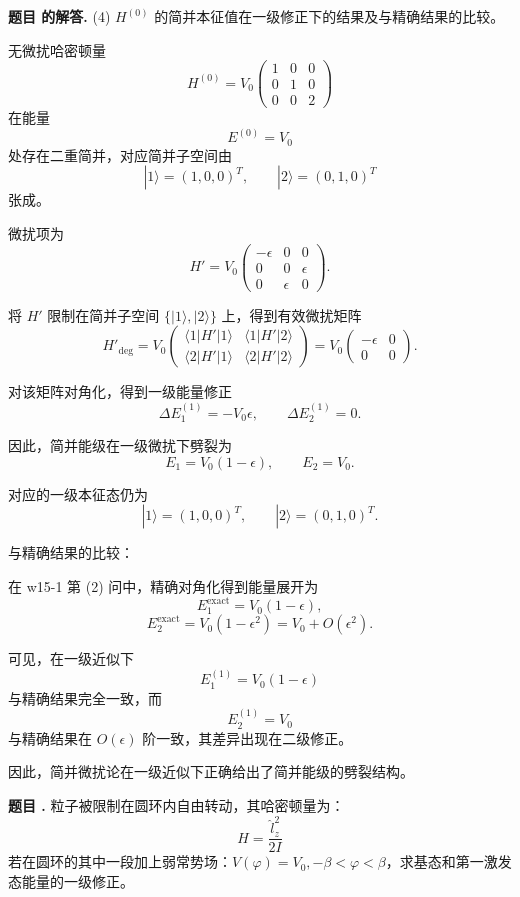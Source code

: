 \documentclass[12pt, a4paper, oneside]{ctexart}
\newcounter{problemname}
\newenvironment{problem}
  {\begin{shaded}\stepcounter{problemname}\par\noindent\textbf{题目 \theproblemname. }}
  {\end{shaded}\par}
\newenvironment{solution}
  {\par\noindent\textbf{题目 \theproblemname 的解答. }}
  {\par}
\begin{document}
\begin{solution}
  (4) $H^{(0)}$ 的简并本征值在一级修正下的结果及与精确结果的比较。

无微扰哈密顿量
\[
H^{(0)} = V_0
\begin{pmatrix}
1 & 0 & 0 \\
0 & 1 & 0 \\
0 & 0 & 2
\end{pmatrix}
\]
在能量
\[
E^{(0)} = V_0
\]
处存在二重简并，对应简并子空间由
\[
|1\rangle = (1,0,0)^T, \qquad
|2\rangle = (0,1,0)^T
\]
张成。

微扰项为
\[
H' = V_0
\begin{pmatrix}
-\epsilon & 0 & 0 \\
0 & 0 & \epsilon \\
0 & \epsilon & 0
\end{pmatrix}.
\]

将 $H'$ 限制在简并子空间 $\{|1\rangle,|2\rangle\}$ 上，得到有效微扰矩阵
\[
H'_{\text{deg}}
=
V_0
\begin{pmatrix}
\langle 1|H'|1\rangle & \langle 1|H'|2\rangle \\
\langle 2|H'|1\rangle & \langle 2|H'|2\rangle
\end{pmatrix}
=
V_0
\begin{pmatrix}
-\epsilon & 0 \\
0 & 0
\end{pmatrix}.
\]

对该矩阵对角化，得到一级能量修正
\[
\Delta E_1^{(1)} = -V_0\epsilon,
\qquad
\Delta E_2^{(1)} = 0.
\]

因此，简并能级在一级微扰下劈裂为
\[
E_1 = V_0(1-\epsilon),
\qquad
E_2 = V_0.
\]

对应的一级本征态仍为
\[
|1\rangle = (1,0,0)^T,
\qquad
|2\rangle = (0,1,0)^T.
\]


与精确结果的比较：

在 w15-1 第 (2) 问中，精确对角化得到能量展开为
\[
E_1^{\text{exact}} = V_0(1-\epsilon),
\]
\[
E_2^{\text{exact}} = V_0(1-\epsilon^2) = V_0 + O(\epsilon^2).
\]

可见，在一级近似下
\[
E_1^{(1)} = V_0(1-\epsilon)
\]
与精确结果完全一致，而
\[
E_2^{(1)} = V_0
\]
与精确结果在 $O(\epsilon)$ 阶一致，其差异出现在二级修正。

因此，简并微扰论在一级近似下正确给出了简并能级的劈裂结构。

\end{solution}
\begin{problem}
粒子被限制在圆环内自由转动，其哈密顿量为：
$$H = \frac{\hat{l}_z^2}{2I}$$
若在圆环的其中一段加上弱常势场：$V(\varphi) = V_0, -\beta < \varphi < \beta$，求基态和第一激发态能量的一级修正。
\end{problem}
\end{document}
